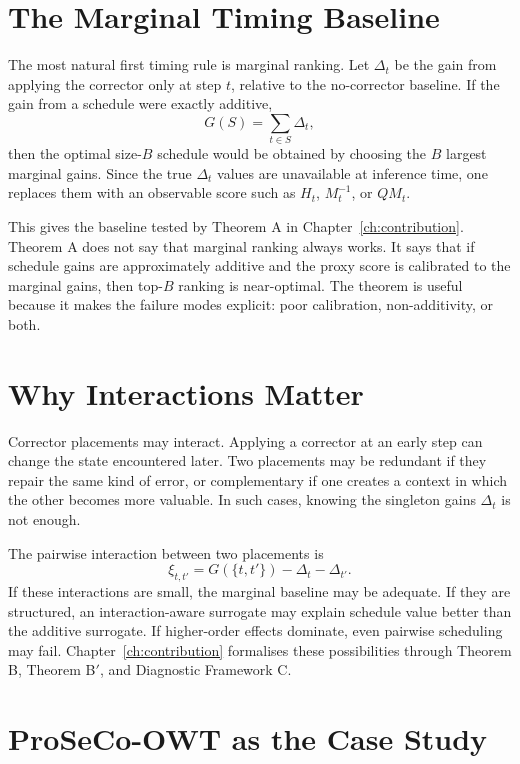\section{The Marginal Timing Baseline}
\label{sec:ch5-marginal-baseline}

The most natural first timing rule is marginal ranking. Let $\Delta_t$ be the
gain from applying the corrector only at step $t$, relative to the no-corrector
baseline. If the gain from a schedule were exactly additive,
\[
  G(S) = \sum_{t\in S}\Delta_t,
\]
then the optimal size-$B$ schedule would be obtained by choosing the $B$ largest
marginal gains. Since the true $\Delta_t$ values are unavailable at inference
time, one replaces them with an observable score such as $H_t$, $M_t^{-1}$, or
$QM_t$.

This gives the baseline tested by Theorem A in Chapter~\ref{ch:contribution}.
Theorem A does not say that marginal ranking always works. It says that if
schedule gains are approximately additive and the proxy score is calibrated to
the marginal gains, then top-$B$ ranking is near-optimal. The theorem is useful
because it makes the failure modes explicit: poor calibration, non-additivity,
or both.

\section{Why Interactions Matter}
\label{sec:ch5-interactions}

Corrector placements may interact. Applying a corrector at an early step can
change the state encountered later. Two placements may be redundant if they
repair the same kind of error, or complementary if one creates a context in
which the other becomes more valuable. In such cases, knowing the singleton
gains $\Delta_t$ is not enough.

The pairwise interaction between two placements is
\[
  \xi_{t,t'} = G(\{t,t'\}) - \Delta_t - \Delta_{t'} .
\]
If these interactions are small, the marginal baseline may be adequate. If
they are structured, an interaction-aware surrogate may explain schedule value
better than the additive surrogate. If higher-order effects dominate, even
pairwise scheduling may fail. Chapter~\ref{ch:contribution} formalises these
possibilities through Theorem B, Theorem B$'$, and Diagnostic Framework C.

\section{ProSeCo-OWT as the Case Study}
\label{sec:ch5-proseco-case-study}

